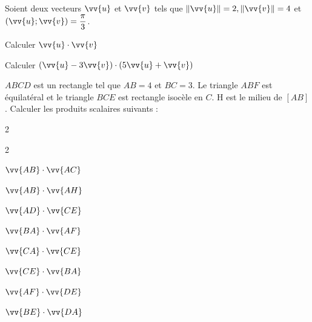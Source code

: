 \documentclass[12pt,a4paper]{article}  %
\begin{document}
Soient deux vecteurs $\vv{u}$ et $\vv{v}$ tels que $\|\vv{u}\|=2,\|\vv{v}\|=4$ et $(\vv{u} ; \vv{v})=\dfrac{\pi}{3}$.
\begin{enumMet}
	\item Calculer $\vv{u}\cdot\vv{v}$
	\item Calculer $(\vv{u}-3 \vv{v}) \cdot(5 \vv{u}+\vv{v})$
\end{enumMet}



$A B C D$ est un rectangle tel que $A B=4$ et $B C=3$. Le triangle $A B F$ est équilatéral et le triangle $B C E$ est rectangle isocèle en $C$. H est le milieu de $[A B]$. Calculer les produits scalaires suivants : 
\begin{multicols}{2}
	\begin{multicols}{2}
	\begin{enumMet}
		\item $ \vv{A B} \cdot  \vv{A C} \quad$ 
		\item $ \vv{A B} \cdot  \vv{A H}$
		\item $ \vv{A D} \cdot  \vv{C E} \quad$ 
		\item $ \vv{B A} \cdot  \vv{A F}$
		\item $ \vv{C A} \cdot  \vv{C E}$
		\item $ \vv{C E} \cdot  \vv{B A} \quad$
		\item $ \vv{A F} \cdot  \vv{D E}$
		\item $ \vv{B E} \cdot  \vv{D A}$
	\end{enumMet}
	\end{multicols}

	\columnbreak
	

\end{multicols}
\end{document}
